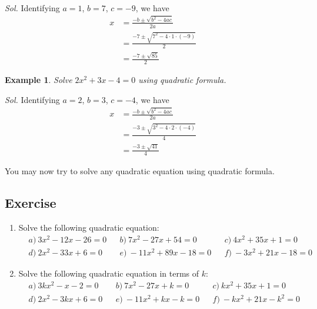 \documentclass[12pt]{article}
\newtheorem{example}{Example}
\begin{document}
    \textit{ Sol.} Identifying $a=1$, $b=7$, $c=-9$, we have \begin{align*}
        x&=\frac{-b\pm\sqrt{b^2-4ac}}{2a}\\
        &=\frac{-7\pm\sqrt{7^2-4\cdot 1\cdot (-9)}}{2}\\
        &=\frac{-7\pm\sqrt{85}}{2}
    \end{align*}

    \begin{example}
        Solve $2x^2+3x-4=0$ using quadratic formula.
    \end{example}

    \textit{ Sol.} Identifying $a=2$, $b=3$, $c=-4$, we have \begin{align*}
        x&=\frac{-b\pm\sqrt{b^2-4ac}}{2a}\\
        &=\frac{-3\pm\sqrt{3^2-4\cdot 2\cdot (-4)}}{4}\\
        &=\frac{-3\pm\sqrt{41}}{4}
    \end{align*}

    You may now try to solve any quadratic equation using quadratic formula.

    \subsection*{Exercise}

    \begin{enumerate}
        \item Solve the following quadratic equation:\begin{align*}
            &a)\ 3x^2-12x-26=0&&b)\ 7x^2-27x+54=0&&c)\ 4x^2+35x+1=0\\
            &d)\ 2x^2-33x+6=0&&e)\ -11x^2+89x-18=0&&f)\ -3x^2+21x-18=0
        \end{align*}
        \item Solve the following quadratic equation in terms of $k$:\begin{align*}
            &a)\ 3kx^2-x-2=0&&b)\ 7x^2-27x+k=0&&c)\ kx^2+35x+1=0\\
            &d)\ 2x^2-3kx+6=0&&e)\ -11x^2+kx-k=0&&f)\ -kx^2+21x-k^2=0
        \end{align*}
    \end{enumerate}
\end{document}
